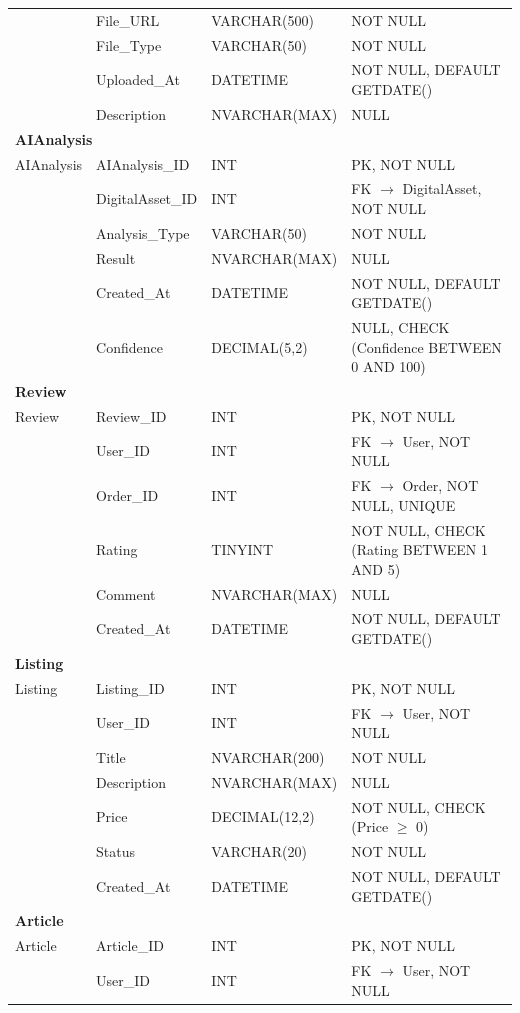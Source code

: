 \documentclass[12pt,a4paper]{article}
\begin{document}
\begin{longtable}{|l|l|l|p{5.8cm}|}
 & File\_URL & VARCHAR(500) & NOT NULL \\
 & File\_Type & VARCHAR(50) & NOT NULL \\
 & Uploaded\_At & DATETIME & NOT NULL, DEFAULT GETDATE() \\
 & Description & NVARCHAR(MAX) & NULL \\
\hline
\multicolumn{4}{|l|}{\textbf{AIAnalysis}} \\
\hline
AIAnalysis & AIAnalysis\_ID & INT & PK, NOT NULL \\
 & DigitalAsset\_ID & INT & FK $\to$ DigitalAsset, NOT NULL \\
 & Analysis\_Type & VARCHAR(50) & NOT NULL \\
 & Result & NVARCHAR(MAX) & NULL \\
 & Created\_At & DATETIME & NOT NULL, DEFAULT GETDATE() \\
 & Confidence & DECIMAL(5,2) & NULL, CHECK (Confidence BETWEEN 0 AND 100) \\
\hline
\multicolumn{4}{|l|}{\textbf{Review}} \\
\hline
Review & Review\_ID & INT & PK, NOT NULL \\
 & User\_ID & INT & FK $\to$ User, NOT NULL \\
 & Order\_ID & INT & FK $\to$ Order, NOT NULL, UNIQUE \\
 & Rating & TINYINT & NOT NULL, CHECK (Rating BETWEEN 1 AND 5) \\
 & Comment & NVARCHAR(MAX) & NULL \\
 & Created\_At & DATETIME & NOT NULL, DEFAULT GETDATE() \\
\hline
\multicolumn{4}{|l|}{\textbf{Listing}} \\
\hline
Listing & Listing\_ID & INT & PK, NOT NULL \\
 & User\_ID & INT & FK $\to$ User, NOT NULL \\
 & Title & NVARCHAR(200) & NOT NULL \\
 & Description & NVARCHAR(MAX) & NULL \\
 & Price & DECIMAL(12,2) & NOT NULL, CHECK (Price $\geq$ 0) \\
 & Status & VARCHAR(20) & NOT NULL \\
 & Created\_At & DATETIME & NOT NULL, DEFAULT GETDATE() \\
\hline
\multicolumn{4}{|l|}{\textbf{Article}} \\
\hline
Article & Article\_ID & INT & PK, NOT NULL \\
 & User\_ID & INT & FK $\to$ User, NOT NULL \\

\end{longtable}
\end{document}
